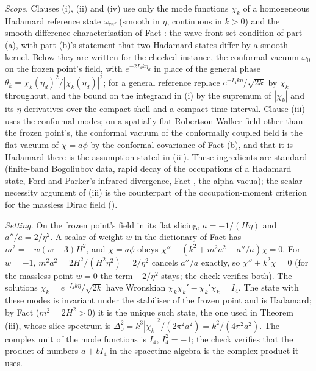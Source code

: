 \emph{Scope.} Clauses (i), (ii) and (iv) use only the mode functions $\chi_{k}$ of a homogeneous Hadamard reference state $\omega_{\mathrm{ref}}$ (smooth in $\eta$, continuous in $k > 0$) and the smooth-difference characterisation of Fact : the wave front set condition of part (a), with part (b)'s statement that two Hadamard states differ by a smooth kernel. Below they are written for the checked instance, the conformal vacuum $\omega_{0}$ on the frozen point's field, with $e^{-2I_{4}k\eta_{d}}$ in place of the general phase $\theta_{k} = \chi_{k}(\eta_{d})^{2}/|\chi_{k}(\eta_{d})|^{2}$; for a general reference replace $e^{-I_{4}k\eta}/\sqrt{2k}$ by $\chi_{k}$ throughout, and the bound on the integrand in (i) by the supremum of $|\chi_{k}|$ and its $\eta$-derivatives over the compact shell and a compact time interval. Clause (iii) uses the conformal modes; on a spatially flat Robertson-Walker field other than the frozen point's, the conformal vacuum of the conformally coupled field is the flat vacuum of $\chi = a\phi$ by the conformal covariance of Fact (b), and that it is Hadamard there is the assumption stated in (iii). These ingredients are standard (finite-band Bogoliubov data, rapid decay of the occupations of a Hadamard state, Ford and Parker's infrared divergence, Fact , the alpha-vacua); the scalar necessity argument of (iii) is the counterpart of the occupation-moment criterion for the massless Dirac field ().

\emph{Setting.} On the frozen point's field in its flat slicing, $a = -1/(H\eta)$ and $a''/a = 2/\eta^{2}$. A scalar of weight $w$ in the dictionary of Fact  has $m^{2} = -w(w + 3)H^{2}$, and $\chi = a\phi$ obeys $\chi'' + (k^{2} + m^{2}a^{2} - a''/a)\chi = 0$. For $w = -1$, $m^{2}a^{2} = 2H^{2}/(H^{2}\eta^{2}) = 2/\eta^{2}$ cancels $a''/a$ exactly, so $\chi'' + k^{2}\chi = 0$ (for the massless point $w = 0$ the term $-2/\eta^{2}$ stays; the check verifies both). The solutions $\chi_{k} = e^{-I_{4}k\eta}/\sqrt{2k}$ have Wronskian $\chi_{k}\bar\chi_{k}' - \chi_{k}'\bar\chi_{k} = I_{4}$. The state with these modes is invariant under the stabiliser of the frozen point and is Hadamard; by Fact  ($m^{2} = 2H^{2} > 0$) it is the unique such state, the one used in Theorem (iii), whose slice spectrum is $\Delta_{0}^{2} = k^{3}|\chi_{k}|^{2}/(2\pi^{2}a^{2}) = k^{2}/(4\pi^{2}a^{2})$. The complex unit of the mode functions is $I_{4}$, $I_{4}^{2} = -1$; the check verifies that the product of numbers $a + bI_{4}$ in the spacetime algebra is the complex product it uses.

